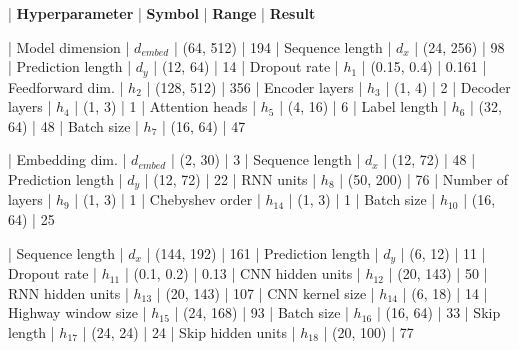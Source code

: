 \documentclass{ieeetmlcn}
\begin{document}
\begin{table}
\centering
\caption{Hyperparameter Ranges for Bayesian Optimization Per Model}
\label{table:hyperparameters}
\footnotesize
\begin{tabular}

\textbf{}  |  \textbf{Hyperparameter}        |  \textbf{Symbol}  |  \textbf{Range}   |  \textbf{Result} 

  |  Model dimension            |  $d_{embed}$    |  (64, 512)   |  194 
  |  Sequence length            |  $d_x$         |  (24, 256)   |  98  
  |  Prediction length          |  $d_y$         |  (12, 64)    |  14  
  |  Dropout rate               |  $h_{1}$       |  (0.15, 0.4)  |  0.161 
  |  Feedforward dim.           |  $h_{2}$       |  (128, 512)  |  356 
  |  Encoder layers             |  $h_{3}$       |  (1, 4)      |  2   
  |  Decoder layers             |  $h_{4}$       |  (1, 3)      |  1   
  |  Attention heads            |  $h_{5}$       |  (4, 16)     |  6   
  |  Label length               |  $h_{6}$       |  (32, 64)    |  48  
  |  Batch size                 |  $h_{7}$      |  (16, 64)    |  47  

  |  Embedding  dim.        |  $d_{embed}$   |  (2, 30)     |  3   
  |  Sequence length            |  $d_x$         |  (12, 72)    |  48  
  |  Prediction length          |  $d_y$         |  (12, 72)    |  22  
  |  RNN units                  |  $h_{8}$      |  (50, 200)   |  76  
  |  Number of layers           |  $h_{9}$      |  (1, 3)      |  1   
  |  Chebyshev order  |  $h_{14}$     |  (1, 3)      |  1   
  |  Batch size                 |  $h_{10}$      |  (16, 64)    |  25  

  |  Sequence length            |  $d_x$         |  (144, 192)  |  161 
  |  Prediction length          |  $d_y$         |  (6, 12)     |  11  
  |  Dropout rate               |  $h_{11}$      |  (0.1, 0.2)  |  0.13 
  |  CNN hidden units           |  $h_{12}$      |  (20, 143)   |  50  
  |  RNN hidden units           |  $h_{13}$      |  (20, 143)   |  107 
  |  CNN kernel size            |  $h_{14}$      |  (6, 18)     |  14  
  |  Highway window size        |  $h_{15}$      |  (24, 168)   |  93  
  |  Batch size                 |  $h_{16}$      |  (16, 64)    |  33  
  |  Skip length                |  $h_{17}$      |  (24, 24)    |  24  
  |  Skip hidden units          |  $h_{18}$      |  (20, 100)   |  77  

\end{tabular}
\end{table}
\end{document}
